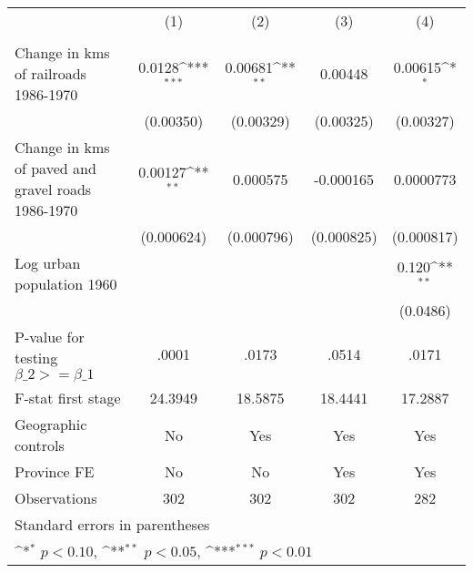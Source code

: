 {
\def\sym#1{\ifmmode^{#1}\else\(^{#1}\)\fi}
\begin{tabular}{l*{4}{c}}
\hline\hline
                &\multicolumn{1}{c}{(1)}&\multicolumn{1}{c}{(2)}&\multicolumn{1}{c}{(3)}&\multicolumn{1}{c}{(4)}\\
                &\multicolumn{1}{c}{}&\multicolumn{1}{c}{}&\multicolumn{1}{c}{}&\multicolumn{1}{c}{}\\
\hline
Change in kms of railroads 1986-1970&   0.0128\sym{***}&  0.00681\sym{**} &  0.00448         &  0.00615\sym{*}  \\
                &(0.00350)         &(0.00329)         &(0.00325)         &(0.00327)         \\
[1em]
Change in kms of paved and gravel roads 1986-1970&  0.00127\sym{**} & 0.000575         &-0.000165         &0.0000773         \\
                &(0.000624)         &(0.000796)         &(0.000825)         &(0.000817)         \\
[1em]
Log urban population 1960&                  &                  &                  &    0.120\sym{**} \\
                &                  &                  &                  & (0.0486)         \\
\hline
P-value for testing $\beta\_{2} >= \beta\_{1}$&    .0001         &    .0173         &    .0514         &    .0171         \\
F-stat first stage&  24.3949         &  18.5875         &  18.4441         &  17.2887         \\
Geographic controls&       No         &      Yes         &      Yes         &      Yes         \\
Province FE     &       No         &       No         &      Yes         &      Yes         \\
Observations    &      302         &      302         &      302         &      282         \\
\hline\hline
\multicolumn{5}{l}{\footnotesize Standard errors in parentheses}\\
\multicolumn{5}{l}{\footnotesize \sym{*} \(p<0.10\), \sym{**} \(p<0.05\), \sym{***} \(p<0.01\)}\\
\end{tabular}
}
